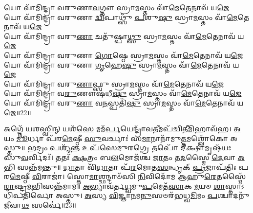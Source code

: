 𑌯𑍋 𑌵𑌾᳴𑌮𑌿𑌨𑍍𑌦𑍍𑌰𑌾 𑌵𑌰𑍁𑌣𑌾\-\ul{𑌵}\-𑌗𑍍𑌨𑍗 𑌸𑍍𑌰𑌾\-\ul{𑌮}\-𑌸𑍍𑌤𑌂 𑌵𑌾᳴\-\ul{𑌮𑍇}\-𑌤𑍇𑌨𑌾𑌵᳴ 𑌯\-\ul{𑌜𑍇}\-\\
𑌯𑍋 𑌵𑌾᳴𑌮𑌿𑌨𑍍𑌦𑍍𑌰𑌾 𑌵𑌰𑍁𑌣𑌾 \ul{𑌦𑍍𑌵𑌿}\-𑌪𑌾𑌥𑍍𑌸𑍁᳴ \ul{𑌪}\-𑌶𑍁\-\ul{𑌷𑍁} 𑌸𑍍𑌰𑌾\-\ul{𑌮}\-𑌸𑍍𑌤𑌂 𑌵𑌾᳴\-\ul{𑌮𑍇}\-𑌤𑍇𑌨𑌾𑌵᳴ 𑌯\-\ul{𑌜𑍇}\-\\
𑌯𑍋 𑌵𑌾᳴𑌮𑌿𑌨𑍍𑌦𑍍𑌰𑌾 𑌵𑌰𑍁\-\ul{𑌣𑌾} 𑌚𑌤𑍁᳴𑌷𑍍𑌪𑌾\-\ul{𑌥𑍍𑌸𑍁} 𑌸𑍍𑌰𑌾\-\ul{𑌮}\-𑌸𑍍𑌤𑌂 𑌵𑌾᳴\-\ul{𑌮𑍇}\-𑌤𑍇𑌨𑌾𑌵᳴ 𑌯\-\ul{𑌜𑍇}\-\\
𑌯𑍋 𑌵𑌾᳴𑌮𑌿𑌨𑍍𑌦𑍍𑌰𑌾 𑌵𑌰𑍁𑌣𑌾 \ul{𑌗𑍋}\-𑌷𑍍𑌠𑍇 𑌸𑍍𑌰𑌾\-\ul{𑌮}\-𑌸𑍍𑌤𑌂 𑌵𑌾᳴\-\ul{𑌮𑍇}\-𑌤𑍇𑌨𑌾𑌵᳴ 𑌯\-\ul{𑌜𑍇}\-\\
𑌯𑍋 𑌵𑌾᳴𑌮𑌿𑌨𑍍𑌦𑍍𑌰𑌾 𑌵𑌰𑍁𑌣𑌾 \ul{𑌗𑍃}\-𑌹𑍇\-\ul{𑌷𑍁} 𑌸𑍍𑌰𑌾\-\ul{𑌮}\-𑌸𑍍𑌤𑌂 𑌵𑌾᳴\-\ul{𑌮𑍇}\-𑌤𑍇𑌨𑌾𑌵᳴ 𑌯\-\ul{𑌜𑍇}\-\\
𑌯𑍋 𑌵𑌾᳴𑌮𑌿𑌨𑍍𑌦𑍍𑌰𑌾 𑌵𑌰𑍁\-\ul{𑌣𑌾}\-𑌫𑍍𑌸𑍁 𑌸𑍍𑌰𑌾\-\ul{𑌮}\-𑌸𑍍𑌤𑌂 𑌵𑌾᳴\-\ul{𑌮𑍇}\-𑌤𑍇𑌨𑌾𑌵᳴ 𑌯\-\ul{𑌜𑍇}\-\\
𑌯𑍋 𑌵𑌾᳴𑌮𑌿𑌨𑍍𑌦𑍍𑌰𑌾 𑌵\-\ul{𑌰𑍁}\-𑌣𑍗𑌷᳴𑌧𑍀\-\ul{𑌷𑍁} 𑌸𑍍𑌰𑌾\-\ul{𑌮}\-𑌸𑍍𑌤𑌂 𑌵𑌾᳴\-\ul{𑌮𑍇}\-𑌤𑍇𑌨𑌾𑌵᳴ 𑌯\-\ul{𑌜𑍇}\-\\
𑌯𑍋 𑌵𑌾᳴𑌮𑌿𑌨𑍍𑌦𑍍𑌰𑌾 𑌵𑌰𑍁\-\ul{𑌣𑌾} 𑌵\-\ul{𑌨}\-𑌸𑍍𑌪𑌤𑌿᳴\-\ul{𑌷𑍁} 𑌸𑍍𑌰𑌾\-\ul{𑌮}\-𑌸𑍍𑌤𑌂 𑌵𑌾᳴\-\ul{𑌮𑍇}\-𑌤𑍇𑌨𑌾𑌵᳴ 𑌯𑌜𑍇॥22॥

𑌅𑌗𑍍𑌨𑍇᳴ 𑌯𑌶\-\ul{𑌸𑍍𑌵𑌿}\-𑌨𑍍 𑌯𑌶᳴\-\ul{𑌸𑍇} 𑌮𑌮᳴\-\ul{𑌰𑍍𑌪}\-𑌯𑍇𑌨𑍍𑌦𑍍𑌰𑌾᳴𑌵\-\ul{𑌤𑍀}\-𑌮𑌪᳴𑌚𑌿𑌤𑍀\-\ul{𑌮𑌿}\-𑌹𑌾𑌵᳴𑌹।
\-\ul{𑌅}\-𑌯𑌂 \ul{𑌮𑍂}\-𑌰𑍍𑌧𑌾 𑌪᳴𑌰\-\ul{𑌮𑍇}\-𑌷𑍍𑌠𑍀 \ul{𑌸𑍁}\-𑌵𑌰𑍍𑌚𑌾𑌃॑ 𑌸\-\ul{𑌮𑌾}\-𑌨𑌾𑌨𑌾᳴𑌮𑍁\-\ul{𑌤𑍍𑌤}\-𑌮𑌶𑍍𑌲𑍋᳴𑌕𑍋 𑌅𑌸𑍍𑌤𑍁॥
\-\ul{𑌭}\-𑌦𑍍𑌰𑌂 𑌪𑌶𑍍𑌯᳴\-\ul{𑌨𑍍𑌤} 𑌉𑌪᳴𑌸𑍇\-\ul{𑌦𑍁}\-𑌰\-\ul{𑌗𑍍𑌰𑍇} 𑌤𑌪𑍋᳴ \ul{𑌦𑍀}\-𑌕𑍍𑌷𑌾𑌮𑍃𑌷᳴𑌯𑌃 𑌸𑍁\-\ul{𑌵}\-𑌰𑍍𑌵𑌿𑌦𑌃᳴।
𑌤𑌤𑌃᳴ \ul{𑌕𑍍𑌷}\-𑌤𑍍𑌰𑌂 𑌬\-\ul{𑌲}\-𑌮𑍋𑌜᳴𑌶𑍍𑌚 \ul{𑌜𑌾}\-𑌤𑌂 𑌤\-\ul{𑌦}\-𑌸𑍍𑌮𑍈 \ul{𑌦𑍇}\-𑌵𑌾 \ul{𑌅}\-𑌭𑌿 𑌸𑌨𑍍𑌨᳴𑌮𑌨𑍍𑌤𑍁॥
\-\ul{𑌧𑌾}\-𑌤𑌾 𑌵𑌿᳴\-\ul{𑌧𑌾}\-𑌤𑌾 𑌪᳴\-\ul{𑌰}\-𑌮𑍋𑌤\-\ul{𑌸}\-𑌨𑍍𑌧𑍃𑌕𑍍 \ul{𑌪𑍍𑌰}\-𑌜𑌾𑌪᳴𑌤𑌿𑌃 𑌪𑌰\-\ul{𑌮𑍇}\-𑌷𑍍𑌠𑍀 \ul{𑌵𑌿}\-𑌰𑌾𑌜𑌾॑।
𑌸𑍍𑌤𑍋\-\ul{𑌮𑌾}\-𑌶𑍍𑌛𑌨𑍍𑌦𑌾𑍞᳴𑌸𑌿 \ul{𑌨𑌿}\-𑌵𑌿𑌦𑍋᳴𑌮 𑌆𑌹𑍁\-\ul{𑌰𑍇}\-𑌤𑌸𑍍𑌮𑍈᳴ \ul{𑌰𑌾}\-𑌷𑍍𑌟𑍍𑌰\-\ul{𑌮}\-𑌭𑌿𑌸𑌨𑍍𑌨᳴𑌮𑌾𑌮॥
\-\ul{𑌅}\-𑌭𑍍𑌯𑌾𑌵᳴𑌰𑍍𑌤\-\ul{𑌧𑍍𑌵}\-𑌮𑍁\-\ul{𑌪}\-𑌮𑍇𑌤᳴\-\ul{𑌸𑌾}\-𑌕 \ul{𑌮}\-𑌯𑍞 \ul{𑌶𑌾}\-𑌸𑍍𑌤𑌾𑌽𑌧𑌿᳴𑌪𑌤𑌿𑌰𑍍𑌵𑍋 𑌅𑌸𑍍𑌤𑍁।
\-\ul{𑌅}\-𑌸𑍍𑌯 \ul{𑌵𑌿}\-𑌜𑍍𑌞𑌾\-\ul{𑌨}\-𑌮\-\ul{𑌨𑍁}\-𑌸𑍞𑌰᳴𑌭𑌧𑍍𑌵\-\ul{𑌮𑌿}\-𑌮𑌂 \ul{𑌪}\-𑌶𑍍𑌚𑌾𑌦𑌨𑍁᳴ 𑌜𑍀𑌵𑌾\-\ul{𑌥} 𑌸𑌰𑍍𑌵𑍇॑॥23॥


